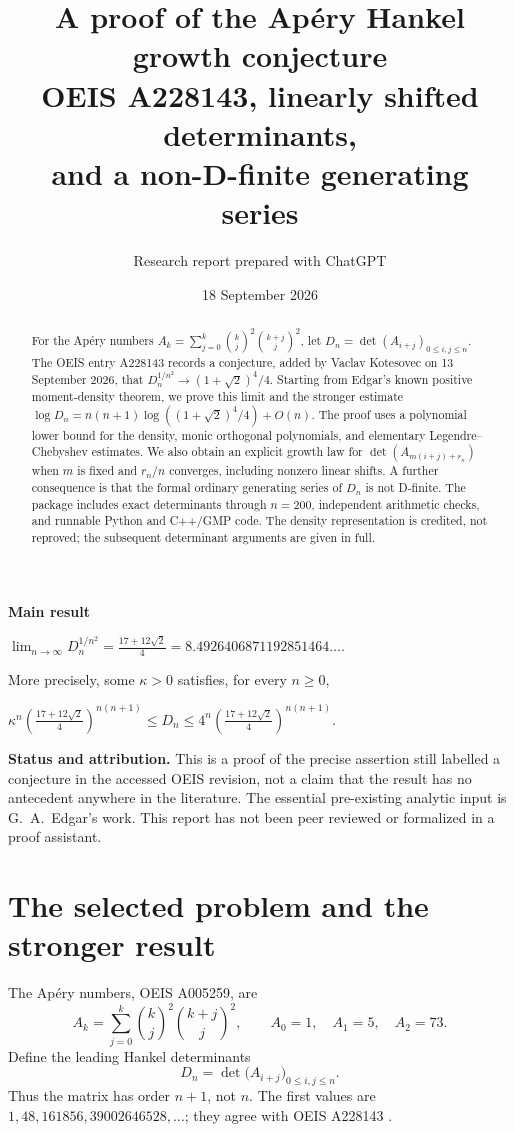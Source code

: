 \documentclass[11pt,a4paper]{article}
\title{\vspace{-1.3em}\color{ink}\textbf{A proof of the Ap\'ery Hankel\texorpdfstring{\\}{ }growth conjecture}\vspace{0.25em}\\
\large OEIS A228143, linearly shifted determinants,\texorpdfstring{\\}{ }and a non-D-finite generating series}
\author{Research report prepared with ChatGPT}
\date{18 September 2026}
\numberwithin{equation}{section}
\theoremstyle{remark}\newtheorem{remark}[theorem]{Remark}
\begin{document}
\maketitle
\thispagestyle{empty}
\begin{abstract}
For the Ap\'ery numbers $A_k=\sum_{j=0}^k\binom{k}{j}^2\binom{k+j}{j}^2$, let
$D_n=\det(A_{i+j})_{0\leq i,j\leq n}$. The OEIS entry A228143 records a conjecture,
added by Vaclav Kotesovec on 13 September 2026, that
$D_n^{1/n^2}\to(1+\sqrt2)^4/4$. Starting from Edgar's known positive moment-density
theorem, we prove this limit and the stronger estimate
$\log D_n=n(n+1)\log((1+\sqrt2)^4/4)+O(n)$.
The proof uses a polynomial lower bound for the density, monic orthogonal
polynomials, and elementary Legendre--Chebyshev estimates. We also obtain an
explicit growth law for $\det(A_{m(i+j)+r_n})$ when $m$ is fixed and $r_n/n$
converges, including nonzero linear shifts. A further consequence is that the
formal ordinary generating series of $D_n$ is not D-finite. The package includes
exact determinants through $n=200$, independent arithmetic checks, and runnable
Python and C++/GMP code. The density representation is credited, not reproved;
the subsequent determinant arguments are given in full.
\end{abstract}

\begin{resultbox}
\centering
\textbf{Main result}\par\medskip
$\displaystyle
\lim_{n\to\infty}D_n^{1/n^2}
=\frac{17+12\sqrt2}{4}
=8.4926406871192851464\ldots.$\par\medskip
More precisely, some $\kappa>0$ satisfies, for every $n\geq0$,\par\smallskip
$\displaystyle
\kappa^n\left(\frac{17+12\sqrt2}{4}\right)^{n(n+1)}
\leq D_n\leq
4^n\left(\frac{17+12\sqrt2}{4}\right)^{n(n+1)}.$
\end{resultbox}

\noindent\textbf{Status and attribution.}
This is a proof of the precise assertion still labelled a conjecture in the
accessed OEIS revision, not a claim that the result has no antecedent anywhere
in the literature. The essential pre-existing analytic input is G.~A.~Edgar's
work. This report has not been peer reviewed or formalized in a proof assistant.

\newpage
\section{The selected problem and the stronger result}
The Ap\'ery numbers, OEIS A005259, are
\begin{equation}\label{eq:apery}
 A_k=\sum_{j=0}^{k}\binom{k}{j}^{\!2}\binom{k+j}{j}^{\!2},
 \qquad A_0=1,\quad A_1=5,\quad A_2=73.
\end{equation}
Define the leading Hankel determinants
\begin{equation}\label{eq:det}
 D_n=\det\bigl(A_{i+j}\bigr)_{0\leq i,j\leq n}.
\end{equation}
Thus the matrix has order $n+1$, not $n$. The first values are
$1,48,161856,39002646528,\ldots$; they agree with OEIS A228143
\cite{oeis-apery,oeis-hankel}.
\end{document}
